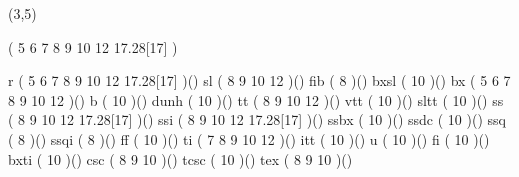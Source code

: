 %
%
%
%
%
%
%

\lhvercheck(3,5)

%
     \tablevalues                         ( 5 6 7 8 9 10 12 17.28[17] )

     \makefont \fonttwoletters r          ( 5 6 7 8 9 10 12 17.28[17] )()
     \makefont \fonttwoletters sl         (       8 9 10 12           )()
     \makefont \fonttwoletters fib        (       8                   )()
     \makefont \fonttwoletters bxsl       (           10              )()
     \makefont \fonttwoletters bx         ( 5 6 7 8 9 10 12           )()
     \makefont \fonttwoletters b          (           10              )()
     \makefont \fonttwoletters dunh       (           10              )()
     \makefont \fonttwoletters tt         (       8 9 10 12           )()
     \makefont \fonttwoletters vtt        (           10              )()
     \makefont \fonttwoletters sltt       (           10              )()
     \makefont \fonttwoletters ss         (       8 9 10 12 17.28[17] )()
     \makefont \fonttwoletters ssi        (       8 9 10 12 17.28[17] )()
     \makefont \fonttwoletters ssbx       (           10              )()
     \makefont \fonttwoletters ssdc       (           10              )()
     \makefont \fonttwoletters ssq        (       8                   )()
     \makefont \fonttwoletters ssqi       (       8                   )()
     \makefont \fonttwoletters ff         (           10              )()
     \makefont \fonttwoletters ti         (     7 8 9 10 12           )()
     \makefont \fonttwoletters itt        (           10              )()
     \makefont \fonttwoletters u          (           10              )()
     \makefont \fonttwoletters fi         (           10              )()
     \makefont \fonttwoletters bxti       (           10              )()
     \makefont \fonttwoletters csc        (       8 9 10              )()
     \makefont \fonttwoletters tcsc       (           10              )()
     \makefont \fonttwoletters tex        (       8 9 10              )()
